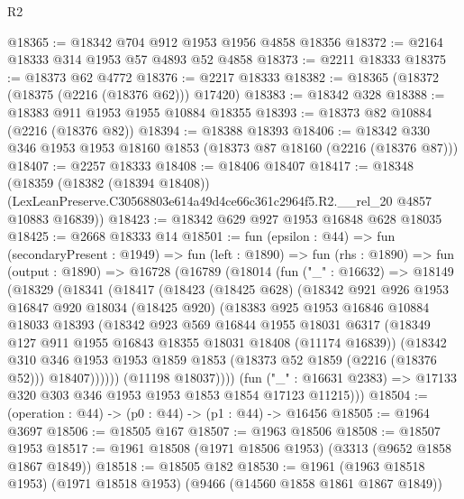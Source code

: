 \begin{lexlean}{R2}
\begin{coremodule}
@18365 := @18342 @704 @912 @1953 @1956 @4858 @18356
@18372 := @2164 @18333 @314 @1953 @57 @4893 @52 @4858
@18373 := @2211 @18333
@18375 := @18373 @62 @4772
@18376 := @2217 @18333
@18382 := @18365 (@18372 (@18375 (@2216 (@18376 @62))) @17420)
@18383 := @18342 @328
@18388 := @18383 @911 @1953 @1955 @10884 @18355
@18393 := @18373 @82 @10884 (@2216 (@18376 @82))
@18394 := @18388 @18393
@18406 := @18342 @330 @346 @1953 @1953 @18160 @1853 (@18373 @87 @18160 (@2216 (@18376 @87)))
@18407 := @2257 @18333
@18408 := @18406 @18407
@18417 := @18348
    (@18359
      (@18382 (@18394 @18408))
      (LexLeanPreserve.C30568803e614a49d4ce66c361c2964f5.R2.__rel_20 @4857 @10883 @16839))
@18423 := @18342 @629 @927 @1953 @16848 @628 @18035
@18425 := @2668 @18333 @14
@18501 := fun (epsilon : @44) =>
  fun (secondaryPresent : @1949) =>
  fun (left : @1890) =>
  fun (rhs : @1890) =>
  fun (output : @1890) =>
  @16728
    (@16789
      (@18014
        (fun ("_" : @16632) =>
        @18149
          (@18329
            (@18341
              (@18417
                (@18423
                  (@18425 @628)
                  (@18342
                    @921
                    @926
                    @1953
                    @16847
                    @920
                    @18034
                    (@18425 @920)
                    (@18383
                      @925
                      @1953
                      @16846
                      @10884
                      @18033
                      @18393
                      (@18342
                        @923
                        @569
                        @16844
                        @1955
                        @18031
                        @6317
                        (@18349 @127 @911 @1955 @16843 @18355 @18031 @18408 (@11174 @16839))
                        (@18342
                          @310
                          @346
                          @1953
                          @1953
                          @1859
                          @1853
                          (@18373 @52 @1859 (@2216 (@18376 @52)))
                          @18407))))))
              (@11198 @18037))))
        (fun ("_" : @16631 @2383) => @17133 @320 @303 @346 @1953 @1953 @1853 @1854 @17123 @11215)))
@18504 := (operation : @44) -> (p0 : @44) -> (p1 : @44) -> @16456
@18505 := @1964 @3697
@18506 := @18505 @167
@18507 := @1963 @18506
@18508 := @18507 @1953
@18517 := @1961 @18508 (@1971 @18506 @1953) (@3313 (@9652 @1858 @1867 @1849))
@18518 := @18505 @182
@18530 := @1961 (@1963 @18518 @1953) (@1971 @18518 @1953) (@9466 (@14560 @1858 @1861 @1867 @1849))

\end{coremodule}
\end{lexlean}
